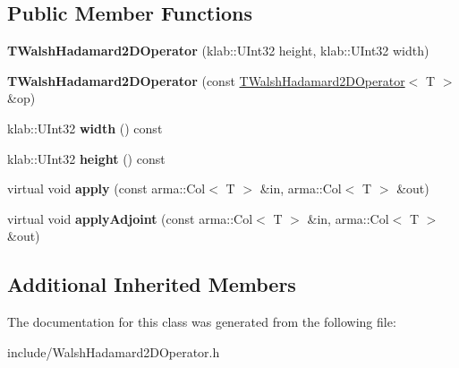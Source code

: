 \subsection*{Public Member Functions}
\begin{DoxyCompactItemize}
\item 
{\bfseries T\+Walsh\+Hadamard2\+D\+Operator} (klab\+::\+U\+Int32 height, klab\+::\+U\+Int32 width)\hypertarget{classkl1p_1_1TWalshHadamard2DOperator_a66a0014948bf2e6ea336799ee201956a}{}\label{classkl1p_1_1TWalshHadamard2DOperator_a66a0014948bf2e6ea336799ee201956a}

\item 
{\bfseries T\+Walsh\+Hadamard2\+D\+Operator} (const \hyperlink{classkl1p_1_1TWalshHadamard2DOperator}{T\+Walsh\+Hadamard2\+D\+Operator}$<$ T $>$ \&op)\hypertarget{classkl1p_1_1TWalshHadamard2DOperator_a7095faebbca349e261494a9f763eee50}{}\label{classkl1p_1_1TWalshHadamard2DOperator_a7095faebbca349e261494a9f763eee50}

\item 
klab\+::\+U\+Int32 {\bfseries width} () const \hypertarget{classkl1p_1_1TWalshHadamard2DOperator_ae2c120323b3f48a4ce438cb0663e576d}{}\label{classkl1p_1_1TWalshHadamard2DOperator_ae2c120323b3f48a4ce438cb0663e576d}

\item 
klab\+::\+U\+Int32 {\bfseries height} () const \hypertarget{classkl1p_1_1TWalshHadamard2DOperator_a026efabf3dcb370064841f2c5d849798}{}\label{classkl1p_1_1TWalshHadamard2DOperator_a026efabf3dcb370064841f2c5d849798}

\item 
virtual void {\bfseries apply} (const arma\+::\+Col$<$ T $>$ \&in, arma\+::\+Col$<$ T $>$ \&out)\hypertarget{classkl1p_1_1TWalshHadamard2DOperator_a55fbc53b7012dba1b1479008ed821453}{}\label{classkl1p_1_1TWalshHadamard2DOperator_a55fbc53b7012dba1b1479008ed821453}

\item 
virtual void {\bfseries apply\+Adjoint} (const arma\+::\+Col$<$ T $>$ \&in, arma\+::\+Col$<$ T $>$ \&out)\hypertarget{classkl1p_1_1TWalshHadamard2DOperator_acab985ef95e14ff1fb5c5c006dee1d04}{}\label{classkl1p_1_1TWalshHadamard2DOperator_acab985ef95e14ff1fb5c5c006dee1d04}

\end{DoxyCompactItemize}
\subsection*{Additional Inherited Members}


The documentation for this class was generated from the following file\+:\begin{DoxyCompactItemize}
\item 
include/Walsh\+Hadamard2\+D\+Operator.\+h\end{DoxyCompactItemize}
